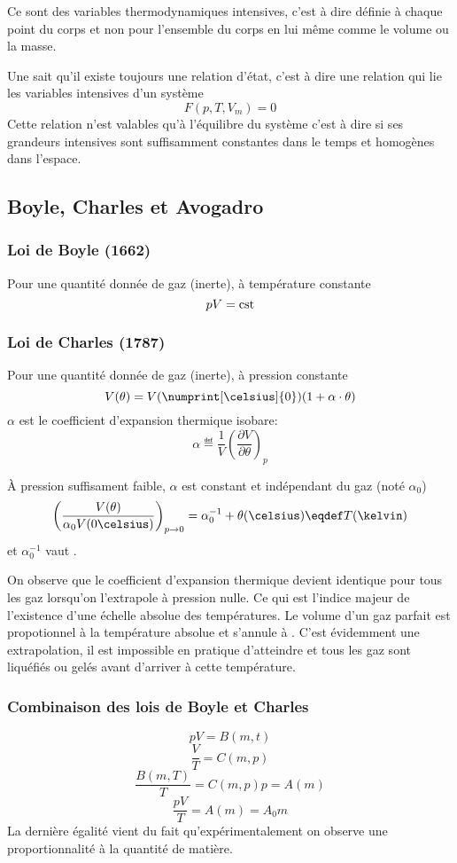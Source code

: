 Ce sont des variables thermodynamiques intensives,
c'est à dire définie à chaque point du corps et
non pour l'ensemble du corps en lui même comme le volume ou la masse.

Une sait qu'il existe toujours une relation d'état,
c'est à dire une relation
qui lie les variables intensives d'un système
\[ F(p, T, V_m) = 0 \]
Cette relation n'est valables qu'à l'équilibre du système
c'est à dire si ses grandeurs intensives sont suffisamment constantes
dans le temps et homogènes dans l'espace.

\subsection{Boyle, Charles et Avogadro}
\subsubsection{Loi de Boyle (1662)}
Pour une quantité donnée de gaz (inerte), à température constante
\[ pV = \mathrm{cst} \]

\subsubsection{Loi de Charles (1787)}
Pour une quantité donnée de gaz (inerte), à pression constante
\[ V(\theta) = V(\numprint[\celsius]{0})(1 + \alpha \cdot \theta) \]
$\alpha$ est le coefficient d'expansion thermique isobare:
\[ \alpha \eqdef
\frac{1}{V}\left(\frac{\partial V}{\partial \theta}\right)_p \]

À pression suffisament faible,
$\alpha$ est constant et indépendant du gaz (noté $\alpha_0$)
\[ \left(\frac{V(\theta)}{\alpha_0 V(0\celsius)}\right)_{p\rightarrow 0} =
\alpha_0^{-1}+\theta(\celsius) \eqdef T(\kelvin) \]
et $\alpha_0^{-1}$ vaut .

On observe que le coefficient d'expansion thermique devient identique
pour tous les gaz lorsqu'on l'extrapole à pression nulle.
Ce qui est l'indice majeur de l'existence
d'une échelle absolue des températures.
Le volume d'un gaz parfait est propotionnel à la température absolue et
s'annule à .
C'est évidemment une extrapolation, il est impossible en pratique d'atteindre
 et tous les gaz sont liquéfiés ou
gelés avant d'arriver à cette température.

\subsubsection{Combinaison des lois de Boyle et Charles}
\[ pV = B(m,t) \]
\[ \frac{V}{T} = C(m,p) \]
\[ \frac{B(m,T)}{T} = C(m,p)p = A(m) \]
\[ \frac{pV}{T} = A(m) = A_0m \]
La dernière égalité vient du fait qu'expérimentalement on observe
une proportionnalité à la quantité de matière.

